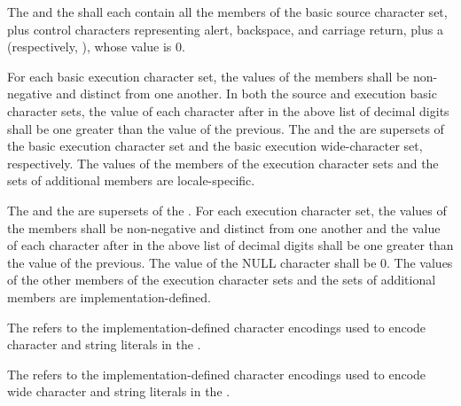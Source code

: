 \documentclass{wg21}
\begin{document}
\pnum
\begin{removedblock}
The  and the
shall each contain all the members of the
basic source character set, plus control characters representing alert,
backspace, and carriage return, plus a 
(respectively, ), whose value is 0.

For each basic execution character set, the values of the
members shall be non-negative and distinct from one another. In both the
source and execution basic character sets, the value of each character
after  in the above list of decimal digits shall be one greater
than the value of the previous. The 
and the  are
supersets of the
basic execution character set and the basic execution wide-character
set, respectively. The values of the members of the execution character sets
and the sets of additional members
are locale-specific.%

\end{removedblock}
\begin{addedblock}
The 
and the  are
supersets of the .
For each execution character set, the values of the
members shall be non-negative and distinct from one another and the value of each character
after  in the above list of decimal digits shall be one greater
than the value of the previous.
The value of the NULL character shall be 0.
The values of the other members of the execution character sets
and the sets of additional members are implementation-defined.%
\end{addedblock}

\begin{addedblock}
The  refers to the implementation-defined character encodings used to encode character and string literals in the .

The  refers to the implementation-defined character encodings used to encode wide character and string literals in the .

\end{addedblock}
\end{document}
